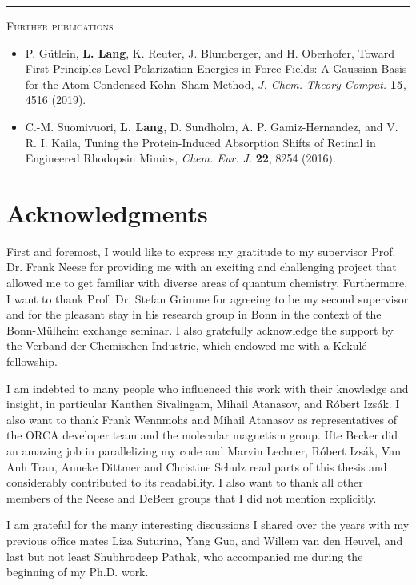 \hrule
\vspace{0.5cm}
{\large\textsc{Further publications}}

\begin{itemize}
\item P. Gütlein, \textbf{L. Lang}, K. Reuter, J. Blumberger, and H. Oberhofer, Toward First-Principles-Level Polarization Energies in Force Fields: A Gaussian Basis for the Atom-Condensed Kohn–Sham Method, \textit{J. Chem. Theory Comput.} \textbf{15}, 4516 (2019).

\item C.-M. Suomivuori, \textbf{L. Lang}, D. Sundholm, A. P. Gamiz-Hernandez, and V. R. I. Kaila, Tuning the Protein-Induced Absorption Shifts of Retinal in Engineered Rho\-dop\-sin Mimics, \textit{Chem. Eur. J.} \textbf{22}, 8254 (2016).
\end{itemize}


\newpage
\chapter*{Acknowledgments}

First and foremost, I would like to express my gratitude to my supervisor Prof. Dr. Frank Neese for providing me with an exciting and challenging project that allowed me to get familiar with diverse areas of quantum chemistry. Furthermore, I want to thank Prof. Dr. Stefan Grimme for agreeing to be my second supervisor and for the pleasant stay in his research group in Bonn in the context of the Bonn-Mülheim exchange seminar. I also gratefully acknowledge the support by the Verband der Chemischen Industrie, which endowed me with a Kekulé fellowship.

I am indebted to many people who influenced this work with their knowledge and insight, in particular Kanthen Sivalingam, Mihail Atanasov, and Róbert Izsák. I also want to thank Frank Wennmohs and Mihail Atanasov as representatives of the ORCA developer team and the molecular magnetism group. Ute Becker did an amazing job in  parallelizing my code and Marvin Lechner, Róbert Izsák, Van Anh Tran, Anneke Dittmer and Christine Schulz read parts of this thesis and considerably contributed to its readability. I also want to thank all other members of the Neese and DeBeer groups that I did not mention explicitly. 

I am grateful for the many interesting discussions I shared over the years with my previous office mates Liza Suturina, Yang Guo, and Willem van den Heuvel, and last but not least Shubhrodeep Pathak, who accompanied me during the beginning of my Ph.D. work.

